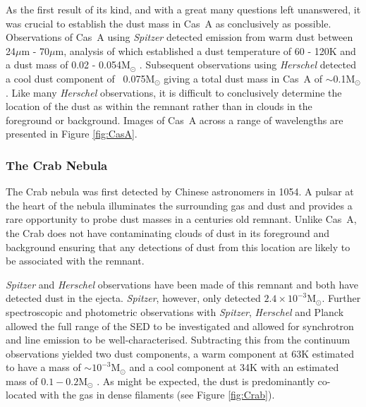 
As the first result of its kind, and with a great many questions left unanswered, it was crucial to establish the dust mass in Cas~A as conclusively as possible.   Observations of Cas~A using \textit{Spitzer} detected emission from warm dust between 24$\mu$m - 70$\mu$m, analysis of which established a dust temperature of 60 - 120K and a dust mass of 0.02 - 0.054M$_{\odot}$ \citep{Rho2008}.  Subsequent observations using \textit{Herschel} detected a cool dust component of ~0.075M$_{\odot}$ giving a total dust mass in Cas~A of $\sim$0.1M$_{\odot}$ \citep{Barlow2010}.  Like many {\em Herschel} observations, it is difficult to conclusively determine the location of the dust as within the remnant rather than in clouds in the foreground or background.  Images of Cas~A across a range of wavelengths are presented in Figure \ref{fig:CasA}.  

\subsubsection{The Crab Nebula}

The Crab nebula was first detected by Chinese astronomers in 1054.  A pulsar at the heart of the nebula illuminates the surrounding gas and dust and provides a rare opportunity to probe dust masses in a centuries old remnant.  Unlike Cas~A, the Crab does not have contaminating clouds of dust in its foreground and background ensuring that any detections of dust from this location are likely to be associated with the remnant.
 
\textit{Spitzer} and \textit{Herschel} observations have been made of this remnant and both have detected dust in the ejecta.  {\em Spitzer}, however, only detected $2.4\times10^{-3}$M$_{\odot}$.  Further spectroscopic and photometric observations with {\em Spitzer}, {\em Herschel} and Planck allowed the full range of the SED to be investigated and allowed for synchrotron and line emission to be well-characterised.  Subtracting this from the continuum observations yielded two dust components, a warm component at 63K estimated to have a mass of $\sim10^{-3}$M$_{\odot}$ and a cool component at  34K with an estimated mass of $0.1 - 0.2$M$_{\odot}$ \citep{Gomez2012,Temim2012}.  As might be expected, the dust is predominantly co-located with the gas in dense filaments (see Figure \ref{fig:Crab}).
 
